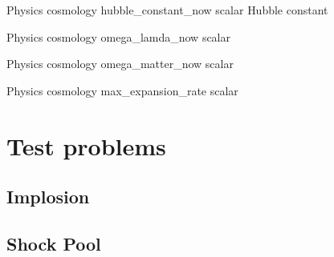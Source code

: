 \documentclass{book}
\begin{document}
\Parameter
{Physics}
{cosmology}
{hubble\_constant\_now}
{scalar}
{}
{Hubble constant}
{}
{}

\Parameter
{Physics}
{cosmology}
{omega\_lamda\_now}
{scalar}
{}
{}
{}
{}

\Parameter
{Physics}
{cosmology}
{omega\_matter\_now}
{scalar}
{}
{}
{}
{}

\Parameter
{Physics}
{cosmology}
{max\_expansion\_rate}
{scalar}
{}
{}
{}
{}

\chapter{Test problems}
\section{Implosion}


\section{Shock Pool}

\end{document}
